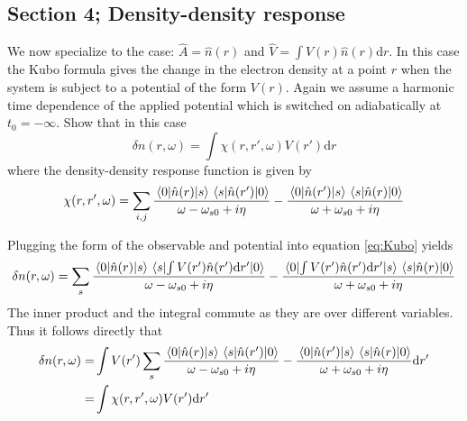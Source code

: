 \subsection{Section 4; Density-density response}
\begin{exercise}
We now specialize to the case: $\hat{A}= \hat{n}(r)$ and $\hat{V} = \int V(r)\hat{n}(r)\mathrm{d}r$. In this case the Kubo formula gives the change in the electron density at a point $r$ when the system is subject to a potential of the form $V(r)$. Again we assume a harmonic time dependence of the applied potential which is switched on adiabatically at $t_0 = -\infty$. Show that in this case
\begin{equation}
    \delta n(r,\omega) = \int \chi(r,r',\omega) V(r')\mathrm{d}r
\end{equation}
where the density-density response function is given by
\begin{equation}
    \chi(r,r',\omega) = \sum_{i,j} \dfrac{\mel{0}{\hat{n}(r)}{s}\mel{s}{\hat{n}(r')}{0}}{\omega - \omega_{s0} + i\eta} - \dfrac{\mel{0}{\hat{n}(r')}{s}\mel{s}{\hat{n}(r)}{0}}{\omega + \omega_{s0} + i\eta}
\end{equation}
\vspace{-0.55cm}
\end{exercise}


\begin{solution}
Plugging the form of the observable and potential into equation \ref{eq:Kubo} yields
\begin{equation}
    \delta n(r,\omega) = \sum_{s} \dfrac{\mel{0}{\hat{n}(r)}{s}\mel{s}{\int V(r')\hat{n}(r')\text{d}r' }{0}}{\omega - \omega_{s0} + i\eta} - \dfrac{\mel{0}{\int V(r')\hat{n}(r')\text{d}r' }{s}\mel{s}{\hat{n}(r)}{0}}{\omega + \omega_{s0} + i\eta} 
\end{equation}
The inner product and the integral commute as they are over different variables. Thus it follows directly that
\begin{equation}
\begin{split}
        \delta n(r,\omega) = &\int V(r') \sum_{s} \dfrac{\mel{0}{\hat{n}(r)}{s}\mel{s}{\hat{n}(r') }{0}}{\omega - \omega_{s0} + i\eta} - \dfrac{\mel{0}{\hat{n}(r') }{s}\mel{s}{\hat{n}(r)}{0}}{\omega + \omega_{s0} + i\eta} \text{d}r' \\
        = & \int \chi(r,r',\omega) V(r') \text{d}r'
\end{split}
\label{eq:densitydensity}
\end{equation}


\end{solution}





